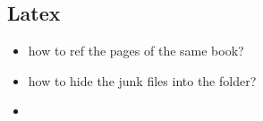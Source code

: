 \subsection{Latex}
\begin{itemize}
    
    \item how to ref the pages of the same book?
    \item how to hide the junk files into the folder?
    \item 
\end{itemize}




